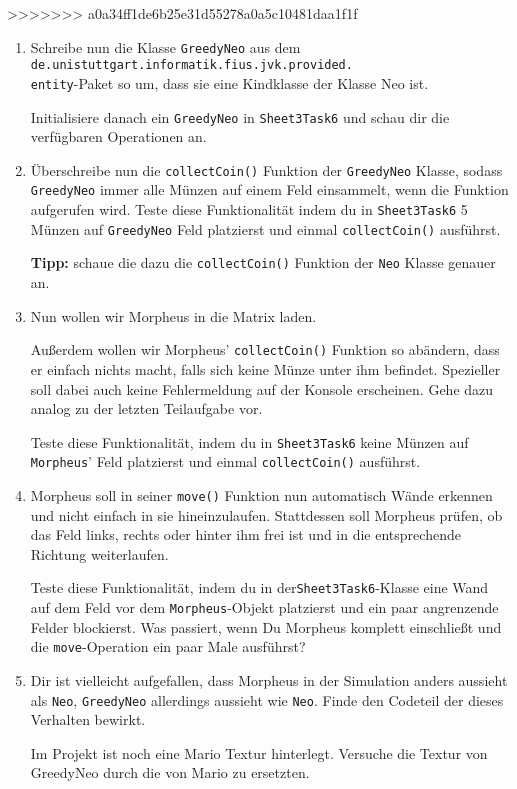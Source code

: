 >>>>>>> a0a34ff1de6b25e31d55278a0a5c10481daa1f1f
\begin{enumerate}\setcounter{enumi}{0}
\item Schreibe nun die Klasse \lstinline{GreedyNeo} aus dem \texttt{de.unistuttgart.informatik.fius.jvk.provided.}\\\texttt{entity}-Paket so um, dass sie eine Kindklasse der Klasse Neo ist.

Initialisiere danach ein \lstinline{GreedyNeo} in \lstinline{Sheet3Task6} und schau dir die verfügbaren Operationen an.

\item Überschreibe nun die \lstinline{collectCoin()} Funktion der \lstinline{GreedyNeo} Klasse, sodass \lstinline{GreedyNeo} immer alle Münzen auf einem Feld einsammelt, wenn die Funktion aufgerufen wird.
Teste diese Funktionalität indem du in \lstinline{Sheet3Task6} 5 Münzen auf \lstinline{GreedyNeo} Feld platzierst und einmal \lstinline{collectCoin()} ausführst.

\textbf{Tipp:} schaue die dazu die \lstinline{collectCoin()} Funktion der \lstinline{Neo} Klasse genauer an.

\item Nun wollen wir Morpheus in die Matrix laden.

Außerdem wollen wir Morpheus' \lstinline{collectCoin()} Funktion so abändern, dass er einfach nichts macht, falls sich keine Münze unter ihm befindet.
Spezieller soll dabei auch keine Fehlermeldung auf der Konsole erscheinen.
Gehe dazu analog zu der letzten Teilaufgabe vor.

Teste diese Funktionalität, indem du in \lstinline{Sheet3Task6} keine Münzen auf \lstinline{Morpheus}' Feld platzierst und einmal \lstinline{collectCoin()} ausführst.

\item Morpheus soll in seiner \lstinline{move()} Funktion nun automatisch Wände erkennen und nicht einfach in sie hineinzulaufen.
Stattdessen soll Morpheus prüfen, ob das Feld links, rechts oder hinter ihm frei ist und in die entsprechende Richtung weiterlaufen.

Teste diese Funktionalität, indem du in der\lstinline{Sheet3Task6}-Klasse eine Wand auf dem Feld vor dem \lstinline{Morpheus}-Objekt platzierst und ein paar angrenzende Felder blockierst.
Was passiert, wenn Du Morpheus komplett einschließt und die \lstinline{move}-Operation ein paar Male ausführst?

\item \optional Dir ist vielleicht aufgefallen, dass Morpheus in der Simulation anders aussieht als \lstinline{Neo}, \lstinline{GreedyNeo} allerdings aussieht wie \lstinline{Neo}.
Finde den Codeteil der dieses Verhalten bewirkt.

Im Projekt ist noch eine Mario Textur hinterlegt.
Versuche die Textur von GreedyNeo durch die von Mario zu ersetzten.

\end{enumerate}
